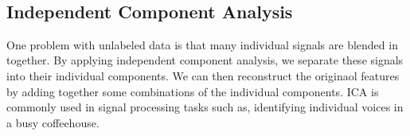 \documentclass[11pt]{article}
\begin{document}
    \begin{center}
    \end{center}
    { \hspace*{\fill} \\}
    
    \subsection{Independent Component
Analysis}\label{independent-component-analysis}

One problem with unlabeled data is that many individual signals are
blended in together. By applying independent component analysis, we
separate these signals into their individual components. We can then
reconstruct the originaol features by adding together some combinations
of the individual components. ICA is commonly used in signal processing
tasks such as, identifying individual voices in a busy coffeehouse.
\end{document}
